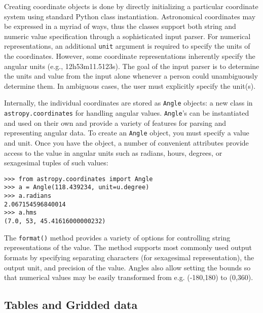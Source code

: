\documentclass[traditabstract]{aa}
\begin{document}

Creating coordinate objects is done by directly initializing a
particular coordinate system using standard Python class
instantiation. Astronomical coordinates may be expressed in a myriad
of ways, thus the classes support both string and numeric value
specification through a sophisticated input parser. For numerical
representations, an additional \texttt{unit} argument is required to
specify the units of the coordinates. However, some coordinate
representations inherently specify the angular units (e.g.,
12h53m11.5123s). The goal of the input parser is to determine the
units and value from the input alone whenever a person could
unambiguously determine them. In ambiguous cases, the user must
explicitly specify the unit(s).

Internally, the individual coordinates are stored as \texttt{Angle}
objects: a new class in \texttt{astropy.coordinates} for handling
angular values. \texttt{Angle}'s can be instantiated and used on their
own and provide a variety of features for parsing and representing
angular data. To create an \texttt{Angle} object, you must specify a
value and unit. Once you have the object, a number of convenient
attributes provide access to the value in angular units such as
radians, hours, degrees, or sexagesimal tuples of such values:

\begin{verbatim}
>>> from astropy.coordinates import Angle
>>> a = Angle(118.439234, unit=u.degree)
>>> a.radians
2.067154596840014
>>> a.hms
(7.0, 53, 45.41616000000232)
\end{verbatim}

The \texttt{format()} method provides a variety of options for
controlling string representations of the value. The method supports
most commonly used output formats by specifying separating characters
(for sexagesimal representation), the output unit, and precision of
the value. Angles also allow setting the bounds so that numerical
values may be easily transformed from e.g. (-180,180) to (0,360).

\subsection{Tables and Gridded data}


\label{sec:table}
\end{document}
